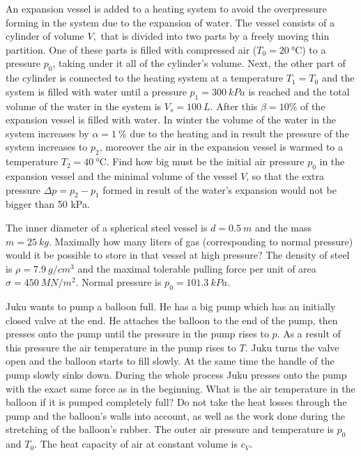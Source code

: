 \documentclass[11pt]{article}
\begin{document}
\probeng
An expansion vessel is added to a heating system to avoid the overpressure forming in the system due to the expansion of water. The vessel consists of a cylinder of volume $V,$ that is divided into two parts by a freely moving thin partition. One of these parts is filled with compressed air ($T_{0}=\SI{20}{\degreeCelsius}$) to a pressure $p_{0}$, taking under it all of the cylinder’s volume. Next, the other part of the cylinder is connected to the heating system at a temperature $T_{1}=T_{0}$ and the system is filled with water until a pressure $p_{1}=\SI{300}{kPa}$ is reached and the total volume of the water in the system is $V_{s}=\SI{100}{L}$. After this $\beta=10\%$ of the expansion vessel is filled with water. In winter the volume of the water in the system increases by $\alpha=\SI{1}{\%}$ due to the heating and in result the pressure of the system increases to $p_{2}$, moreover the air in the expansion vessel is warmed to a temperature $T_{2}=\SI{40}{\degreeCelsius}$. Find how big must be the initial air pressure $p_{0}$ in the expansion vessel and the minimal volume of the vessel $V$, so that the extra pressure $\Delta p=p_{2}-p_{1}$ formed in result of the water’s expansion would not be bigger than 50 kPa.
\probend
\bigskip


\probeng
The inner diameter of a spherical steel vessel is $d=\SI{0.5}{m}$ and the mass $m=\SI{25}{kg}$. Maximally how many liters of gas (corresponding to normal pressure) would it be possible to store in that vessel at high pressure? The density of steel is $\rho=\SI{7.9}{g/cm^3}$ and the maximal tolerable pulling force per unit of area $\sigma=\SI{450}{MN/m^2}$. Normal pressure is $p_0=\SI{101.3}{kPa}$.
\probend
\bigskip


\probeng
Juku wants to pump a balloon full. He has a big pump which has an initially closed valve at the end. He attaches the balloon to the end of the pump, then presses onto the pump until the pressure in the pump rises to $p$. As a result of this pressure the air temperature in the pump rises to $T$. Juku turns the valve open and the balloon starts to fill slowly. At the same time the handle of the pump slowly sinks down. During the whole process Juku presses onto the pump with the exact same force as in the beginning. What is the air temperature in the balloon if it is pumped completely full? Do not take the heat losses through the pump and the balloon’s walls into account, as well as the work done during the stretching of the balloon’s rubber. The outer air pressure and temperature is $p_0$ and $T_0$. The heat capacity of air at constant volume is $c_V$.
\probend
\bigskip
\end{document}
